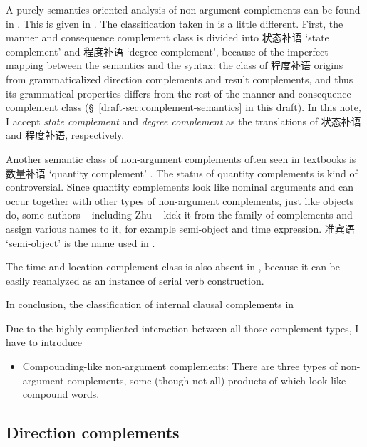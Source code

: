 \documentclass[UTF8, a4paper, oneside, scheme=plain]{ctexart}
\newcommand*{\citesec}[1]{\S~{#1}}
\newcommand*{\term}[1]{\emph{#1}}
\newcommand{\draft}{\href{./main.pdf}{this draft}}
\newcommand{\translate}[1]{`#1'}
\begin{document}
A purely semantics-oriented analysis of non-argument complements 
can be found in .
This is given in \cite[5.8]{xianhan2004}.
The classification taken in \citet{zhudexigrammar} is a little different.
First, the manner and consequence complement class 
is divided into 状态补语 \translate{state complement}
and 程度补语 \translate{degree complement},
because of the imperfect mapping 
between the semantics and the syntax: 
the class of 程度补语 origins from grammaticalized direction complements and result complements,
and thus its grammatical properties differs from the rest of the manner and consequence complement class
(\citesec{\ref{draft-sec:complement-semantics}} in \draft).
In this note, I accept \term{state complement} and \term{degree complement}
as the translations of 状态补语 and 程度补语, respectively.

Another semantic class of non-argument complements often seen in textbooks is 
数量补语 \translate{quantity complement} \citep[\citesec{7.1}]{zhuqingming2005}.
The status of quantity complements  is kind of controversial.
Since quantity complements look like nominal arguments 
and can occur together with other types of non-argument complements, 
just like objects do, some authors -- including Zhu -- 
kick it from the family of complements and assign various names to it, 
for example semi-object and time expression. 
准宾语 \translate{semi-object} is the name used in \citet{zhudexigrammar}. %

The time and location complement class is also absent in \citet{zhudexigrammar},
because it can be easily reanalyzed as an instance of serial verb construction.

In conclusion, the classification of internal clausal complements in \citet{zhudexigrammar} %

Due to the highly complicated interaction between all those complement types,
I have to introduce %
\begin{itemize}
    \item Compounding-like non-argument complements:
    There are three types of non-argument complements,
    some (though not all) products of which look like compound words.   
\end{itemize}

\subsection{Direction complements}
\end{document}
